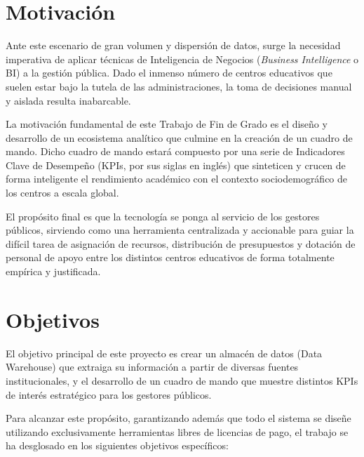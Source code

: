 \section{Motivación}

Ante este escenario de gran volumen y dispersión de datos, surge la necesidad imperativa de aplicar técnicas de Inteligencia de Negocios (\textit{Business Intelligence} o BI) a la gestión pública. Dado el inmenso número de centros educativos que suelen estar bajo la tutela de las administraciones, la toma de decisiones manual y aislada resulta inabarcable.

La motivación fundamental de este Trabajo de Fin de Grado es el diseño y desarrollo de un ecosistema analítico que culmine en la creación de un cuadro de mando. Dicho cuadro de mando estará compuesto por una serie de Indicadores Clave de Desempeño (KPIs, por sus siglas en inglés) que sinteticen y crucen de forma inteligente el rendimiento académico con el contexto sociodemográfico de los centros a escala global. 

El propósito final es que la tecnología se ponga al servicio de los gestores públicos, sirviendo como una herramienta centralizada y accionable para guiar la difícil tarea de asignación de recursos, distribución de presupuestos y dotación de personal de apoyo entre los distintos centros educativos de forma totalmente empírica y justificada.

\section{Objetivos}
\label{sec:objetivos}

El objetivo principal de este proyecto es crear un almacén de datos (Data Warehouse) que extraiga su información a partir de diversas fuentes institucionales, y el desarrollo de un cuadro de mando que muestre distintos KPIs de interés estratégico para los gestores públicos.

Para alcanzar este propósito, garantizando además que todo el sistema se diseñe utilizando exclusivamente herramientas libres de licencias de pago, el trabajo se ha desglosado en los siguientes objetivos específicos:


